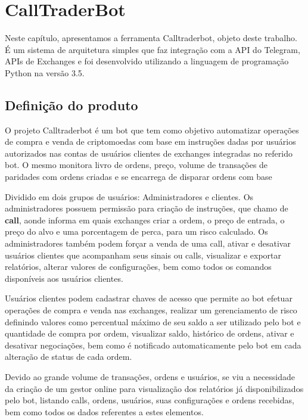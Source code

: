 \chapter{CallTraderBot} \label{cha:ctb}

Neste capítulo, apresentamos a ferramenta Calltraderbot, objeto deste trabalho. É um sistema de arquitetura simples que faz integração com a API do Telegram, APIs de Exchanges e foi desenvolvido utilizando a linguagem de programação Python na versão 3.5.

\section{Definição do produto} \label{sec:ctb:definicao}

O projeto Calltraderbot é um bot que tem como objetivo automatizar  operações de compra e venda de criptomoedas com base em instruções dadas por usuários autorizados nas contas de usuários clientes de exchanges integradas no referido bot. O mesmo monitora livro de ordens, preço, volume de transações de paridades com ordens criadas e se encarrega de disparar ordens com base 

Dividido em dois grupos de usuários: Administradores e clientes. Os administradores possuem permissão para criação de instruções, que chamo de \textbf{call}, aonde informa em quais exchanges criar a ordem, o preço de entrada, o preço do alvo e uma porcentagem de perca, para um risco calculado. Os administradores também podem forçar a venda de uma call, ativar e desativar usuários clientes que acompanham seus sinais ou calls, visualizar e exportar relatórios, alterar valores de configurações, bem como todos os comandos disponíveis aos usuários clientes.

Usuários clientes podem cadastrar chaves de acesso que permite ao bot efetuar operações de compra e venda nas exchanges, realizar um gerenciamento de risco definindo valores como percentual máximo de seu saldo a ser utilizado pelo bot e quantidade de compra por ordem, visualizar saldo, histórico de ordens, ativar e desativar negociações, bem como é notificado automaticamente pelo bot em cada alteração de status de cada ordem.

Devido ao grande volume de transações, ordens e usuários, se viu a necessidade da criação de um gestor online para visualização dos relatórios já disponibilizados pelo bot, listando calls, ordens, usuários, suas configurações e ordens recebidas, bem como todos os dados referentes a estes elementos.

